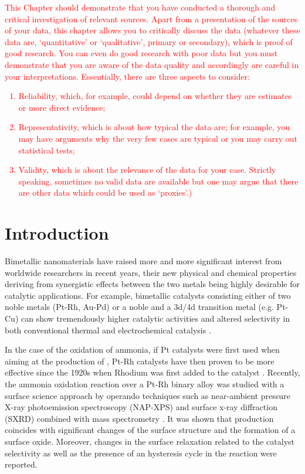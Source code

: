 \textcolor{red}{This Chapter should demonstrate that you have conducted a thorough and critical investigation of relevant sources.
Apart from a presentation of the sources of your data, this chapter allows you to critically discuss the data (whatever these data are, ‘quantitative’ or ‘qualitative’, primary or secondary), which is proof of good research. You can even do good research with poor data but you must demonstrate that you are aware of the data quality and accordingly are careful in your interpretations. Essentially, there are three aspects to consider:
\begin{enumerate}
\item	Reliability, which, for example, could depend on whether they are estimates or more direct evidence;
\item	Representativity, which is about how typical the data are; for example, you may have arguments why the very few cases are typical or you may carry out statistical tests;
\item Validity, which is about the relevance of the data for your case. Strictly speaking, sometimes no valid data are available but one may argue that there are other data which could be used as ‘proxies’.)
\end{enumerate}
}

\section{Introduction}

Bimetallic nanomaterials have raised more and more significant interest from worldwide researchers in recent years, their new physical and chemical properties deriving from synergistic effects between the two metals being highly desirable for catalytic applications.
For example, bimetallic catalysts consisting either of two noble metals (Pt-Rh, Au-Pd) or a noble and a 3d/4d transition metal (e.g. Pt-Cu) can show tremendously higher catalytic activities and altered selectivity in both conventional thermal and electrochemical catalysis \parencite{Resta2020a, Carnis2021b}.

In the case of the oxidation of ammonia, if Pt catalysts were first used when aiming at the production of \nitricoxide, Pt-Rh catalysts have then proven to be more effective since the 1920s when Rhodium was first added to the catalyst \parencite{Handforth1934, Heck1982}.
Recently, the ammonia oxidation reaction over a Pt-Rh binary alloy was studied with a surface science approach by operando techniques such as near-ambient pressure X-ray photoemission spectroscopy (NAP-XPS) and surface x-ray diffraction (SXRD) combined with mass spectrometry \parencite{Resta2020a}.
It was shown that \nitricoxide production coincides with significant changes of the surface structure and the formation of a  surface oxide.
Moreover, changes in the surface relaxation related to the catalyst selectivity as well as the presence of an hysteresis cycle in the reaction were reported.

